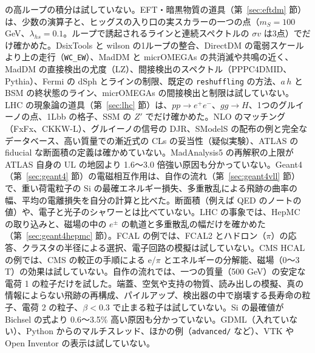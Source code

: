 \documentclass[a4paper,10pt]{ltjsarticle}
\begin{document}
の高ループの積分は試していない。EFT・暗黒物質の道具（第~\ref{sec:eftdm} 節）は、少数の演算子と、ヒッグスの入り口の実スカラーの一つの点（$m_S=100$ GeV、$\lambda_{hs}=0.1$。ループで誘起されるラインと連続スペクトルの $\sigma v$ は3点）でだけ確かめた。DsixTools と wilson の1ループの整合、DirectDM の電弱スケールより上の走行（\texttt{WC\_EW}）、MadDM と micrOMEGAs の共消滅や共鳴の近く、MadDM の直接検出の尤度（LZ）、間接検出のスペクトル（PPPC4DMID、Pythia）、Fermi の dSph とラインの制限、既定の \texttt{reshuffling} の方法、$a\,h$ と BSM の終状態のライン、micrOMEGAs の間接検出と制限は試していない。LHC の現象論の道具（第~\ref{sec:lhc} 節）は、$pp\to e^+e^-$、$gg\to H$、1つのグルイーノの点、1Lbb の格子、SSM の $Z'$ でだけ確かめた。NLO のマッチング（FxFx、CKKW-L）、グルイーノの信号の DJR、SModelS の配布の例と完全なデータベース、高い質量での漸近式の CLs の妥当性（疑似実験）、ATLAS の fiducial な断面積の定義は確かめていない。MadAnalysis5 の再解釈の上限が ATLAS 自身の UL の地図より 1.6〜3.0 倍強い原因も分かっていない。Geant4（第~\ref{sec:geant4} 節）の電磁相互作用は、自作の流れ（第~\ref{sec:geant4vll} 節）で、重い荷電粒子の Si の最確エネルギー損失、多重散乱による飛跡の曲率の幅、平均の電離損失を自分の計算と比べた。断面積（例えば QED のノートの値）や、電子と光子のシャワーとは比べていない。LHC の事象では、HepMC の取り込みと、磁場の中の $e^\pm$ の軌道と多重散乱の幅だけを確かめた（第~\ref{sec:geant4hepmc} 節）。FCAL の例では、FCAL2 とハドロン（$\pi$）の応答、クラスタの半径による選択、電子回路の模擬は試していない。CMS HCAL の例では、CMS の較正の手順による e/$\pi$ とエネルギーの分解能、磁場（0〜3 T）の効果は試していない。自作の流れでは、一つの質量（500 GeV）の安定な電荷 1 の粒子だけを試した。端蓋、空気や支持の物質、読み出しの模擬、真の情報によらない飛跡の再構成、パイルアップ、検出器の中で崩壊する長寿命の粒子、電荷 2 の粒子、$\beta<0.3$ で止まる粒子は試していない。Si の最確値が Bichsel の式より 0.6〜3.5\% 高い原因も分かっていない。GDML（入れていない）、Python からのマルチスレッド、ほかの例（\texttt{advanced/} など）、VTK や Open Inventor の表示は試していない。
\end{document}
